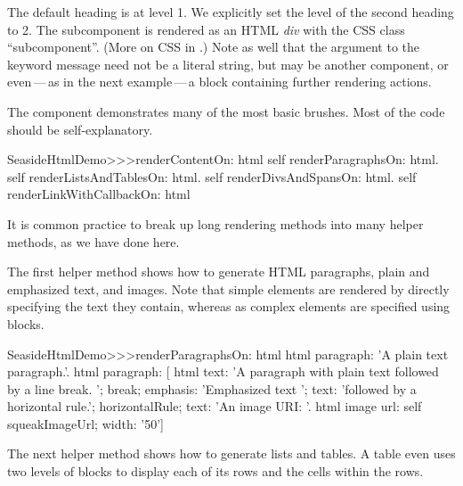 \documentclass[a4paper,10pt,twoside]{book}
\begin{document}

The default heading is at level 1.
We explicitly set the level of the second heading to 2.
The subcomponent is rendered as an HTML \emph{div} with the CSS class ``subcomponent''.
(More on CSS in .)
Note as well that the argument to the  keyword message need not be a literal string, but may be another component, or even\,---\,as in the next example\,---\,a block containing further rendering actions.

The  component demonstrates many of the most basic brushes.
Most of the code should be self-explanatory.

\begin{code}{}
SeasideHtmlDemo>>>renderContentOn: html 
	self renderParagraphsOn: html.
	self renderListsAndTablesOn: html.
	self renderDivsAndSpansOn: html.
	self renderLinkWithCallbackOn: html
\end{code}

It is common practice to break up long rendering methods into many helper methods, as we have done here.


The first helper method shows how to generate HTML paragraphs, plain and emphasized text, and images.
Note that simple elements are rendered by directly specifying the text they contain, whereas as complex elements are specified using blocks.

\begin{code}{}
SeasideHtmlDemo>>>renderParagraphsOn: html 
	html paragraph: 'A plain text paragraph.'.
	html paragraph: [
		html
			text: 'A paragraph with plain text followed by a line break. ';
			break;
			emphasis: 'Emphasized text ';
			text: 'followed by a horizontal rule.';
			horizontalRule;
			text: 'An image URI: '.
		html image
			url: self squeakImageUrl;
			width: '50']
\end{code}

The next helper method shows how to generate lists and tables.
A table even uses two levels of blocks to display each of its rows and the cells within the rows.
\end{document}
